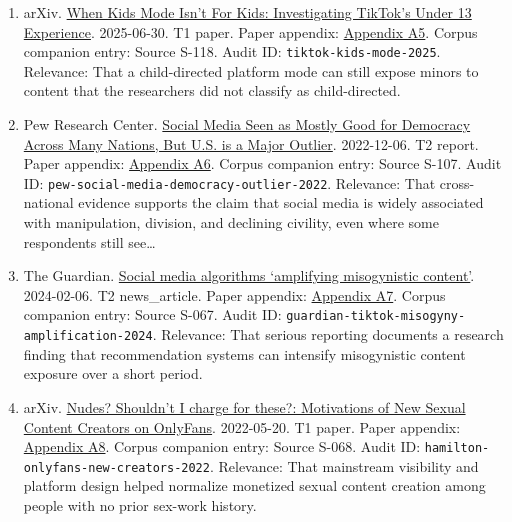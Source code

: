 \documentclass[
  american,
  11pt,
  letterpaper,
]{article}
\begin{document}
\begin{enumerate}
{  Engage in Body Image and Shaming Discussions via Instagram Direct
  Messages (DMs)}. 2025-04-02. T1 paper. Paper appendix:
  \hyperref[ch-02-appendix-a4-unfiltered-how-teens-engage-in-body-image-and-shaming-discussions-via-instagram-direct-messages-dms]{Appendix
  A4}. Corpus companion entry: Source S-072. Audit ID:
  \texttt{instagram-body-image-dms-2025}. Relevance: That teen
  body-image discourse on Instagram is not confined to public feeds; it
  also unfolds in private channels that shape social reinforcement and
  harm.
\item
  arXiv. \href{https://arxiv.org/abs/2507.00299}{When Kids Mode Isn't
  For Kids: Investigating TikTok's Under 13 Experience}. 2025-06-30. T1
  paper. Paper appendix:
  \hyperref[ch-02-appendix-a5-when-kids-mode-isn-t-for-kids-investigating-tiktok-s-under-13-experience]{Appendix
  A5}. Corpus companion entry: Source S-118. Audit ID:
  \texttt{tiktok-kids-mode-2025}. Relevance: That a child-directed
  platform mode can still expose minors to content that the researchers
  did not classify as child-directed.
\item
  Pew Research Center.
  \href{https://www.pewresearch.org/global/2022/12/06/social-media-seen-as-mostly-good-for-democracy-across-many-nations-but-u-s-is-a-major-outlier/}{Social
  Media Seen as Mostly Good for Democracy Across Many Nations, But U.S.
  is a Major Outlier}. 2022-12-06. T2 report. Paper appendix:
  \hyperref[ch-02-appendix-a6-social-media-seen-as-mostly-good-for-democracy-across-many-nations-but-u-s-is-a-major-outlier]{Appendix
  A6}. Corpus companion entry: Source S-107. Audit ID:
  \texttt{pew-social-media-democracy-outlier-2022}. Relevance: That
  cross-national evidence supports the claim that social media is widely
  associated with manipulation, division, and declining civility, even
  where some respondents still see\ldots{}
\item
  The Guardian.
  \href{https://www.theguardian.com/media/2024/feb/06/social-media-algorithms-amplifying-misogynistic-content}{Social
  media algorithms `amplifying misogynistic content'}. 2024-02-06. T2
  news\_article. Paper appendix:
  \hyperref[ch-02-appendix-a7-social-media-algorithms-amplifying-misogynistic-content]{Appendix
  A7}. Corpus companion entry: Source S-067. Audit ID:
  \texttt{guardian-tiktok-misogyny-amplification-2024}. Relevance: That
  serious reporting documents a research finding that recommendation
  systems can intensify misogynistic content exposure over a short
  period.
\item
  arXiv. \href{https://arxiv.org/abs/2205.10425}{Nudes? Shouldn't I
  charge for these?: Motivations of New Sexual Content Creators on
  OnlyFans}. 2022-05-20. T1 paper. Paper appendix:
  \hyperref[ch-02-appendix-a8-nudes-shouldn-t-i-charge-for-these-motivations-of-new-sexual-content-creators-on-onlyfans]{Appendix
  A8}. Corpus companion entry: Source S-068. Audit ID:
  \texttt{hamilton-onlyfans-new-creators-2022}. Relevance: That
  mainstream visibility and platform design helped normalize monetized
  sexual content creation among people with no prior sex-work history.
\end{enumerate}
\end{document}
